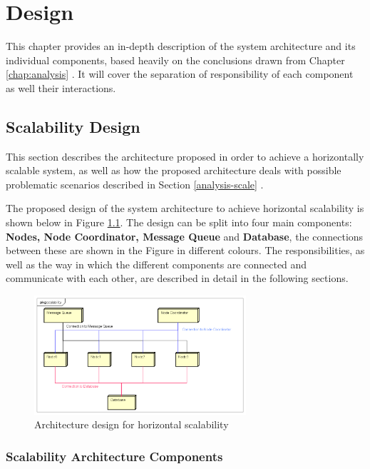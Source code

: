 \chapter{Design} \label{design:design}
This chapter provides an in-depth description of the system architecture and its individual components, based heavily on the conclusions drawn from Chapter \ref{chap:analysis} . It will cover the separation of responsibility of each component as well their interactions.

\section{Scalability Design}
This section describes the architecture proposed in order to achieve a horizontally scalable system, as well as how the proposed architecture deals with possible problematic scenarios described in Section \ref{analysis-scale} .

The proposed design of the system architecture to achieve horizontal scalability is shown below in Figure \ref{fig:scalability-architecture}. The design can be split into four main components: \textbf{Nodes, Node Coordinator, Message Queue} and \textbf{Database}, the connections between these are shown in the Figure in different colours. The responsibilities, as well as the way in which the different components are connected and communicate with each other, are described in detail in the following sections.

\begin{figure}[!ht]
	\centering
	\includegraphics[width=0.7\textwidth]{figures/03_design/scalability-architecture}
    \caption{Architecture design for horizontal scalability}
    \label{fig:scalability-architecture}
\end{figure}

\subsection{Scalability Architecture Components} \label{design:scale-components}
